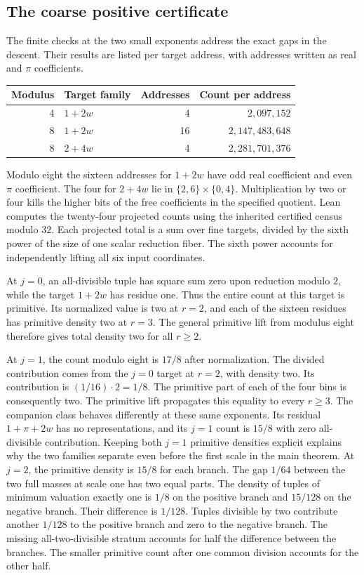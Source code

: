 \documentclass[12pt,letterpaper]{article}
\begin{document}
\subsection{The coarse positive certificate}
The finite checks at the two small exponents address the exact gaps in the descent. Their results are listed per target address, with addresses written as real and $\pi$ coefficients.
\begin{center}
\begin{tabular}{@{}r l r r@{}}
\toprule
Modulus & Target family & Addresses & Count per address \\
\midrule
4 & $1+2w$ & 4 & $2{,}097{,}152$ \\
8 & $1+2w$ & 16 & $2{,}147{,}483{,}648$ \\
8 & $2+4w$ & 4 & $2{,}281{,}701{,}376$ \\
\bottomrule
\end{tabular}
\end{center}
Modulo eight the sixteen addresses for $1+2w$ have odd real coefficient and even $\pi$ coefficient. The four for $2+4w$ lie in $\{2,6\}\times\{0,4\}$. Multiplication by two or four kills the higher bits of the free coefficients in the specified quotient. Lean computes the twenty-four projected counts using the inherited certified census modulo $32$. Each projected total is a sum over fine targets, divided by the sixth power of the size of one scalar reduction fiber. The sixth power accounts for independently lifting all six input coordinates.

At $j=0$, an all-divisible tuple has square sum zero upon reduction modulo $2$, while the target $1+2w$ has residue one. Thus the entire count at this target is primitive. Its normalized value is two at $r=2$, and each of the sixteen residues has primitive density two at $r=3$. The general primitive lift from modulus eight therefore gives total density two for all $r\geq2$.

At $j=1$, the count modulo eight is $17/8$ after normalization. The divided contribution comes from the $j=0$ target at $r=2$, with density two. Its contribution is $(1/16)\cdot2=1/8$. The primitive part of each of the four bins is consequently two. The primitive lift propagates this equality to every $r\geq3$. The companion class behaves differently at these same exponents. Its residual $1+\pi+2w$ has no representations, and its $j=1$ count is $15/8$ with zero all-divisible contribution. Keeping both $j=1$ primitive densities explicit explains why the two families separate even before the first scale in the main theorem. At $j=2$, the primitive density is $15/8$ for each branch. The gap $1/64$ between the two full masses at scale one has two equal parts. The density of tuples of minimum valuation exactly one is $1/8$ on the positive branch and $15/128$ on the negative branch. Their difference is $1/128$. Tuples divisible by two contribute another $1/128$ to the positive branch and zero to the negative branch. The missing all-two-divisible stratum accounts for half the difference between the branches. The smaller primitive count after one common division accounts for the other half.
\end{document}
